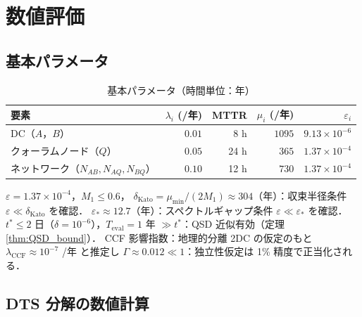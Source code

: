 \documentclass[12pt,a4paper]{article}
\theoremstyle{plain}
\theoremstyle{definition}
\theoremstyle{remark}
\newcommand{\eps}{\varepsilon}
\newcommand{\Teval}{T_{\mathrm{eval}}}
\begin{document}
\section{数値評価}\label{sec:numerical}

\subsection{基本パラメータ}

\begin{table}[H]
  \centering
  \caption{基本パラメータ（時間単位：年）}
  \label{tab:params}
  \begin{tabular}{lrrrr}
    \toprule
    要素 & $\lambda_i$ (/年) & MTTR & $\mu_i$ (/年) & $\eps_i$ \\
    \midrule
    DC（$A$，$B$）                              & $0.01$  & 8 h  & $1095$ & $9.13\times10^{-6}$ \\
    クォーラムノード（$Q$）                      & $0.05$  & 24 h & $365$  & $1.37\times10^{-4}$ \\
    ネットワーク（$N_{AB},N_{AQ},N_{BQ}$） & $0.10$  & 12 h & $730$  & $1.37\times10^{-4}$ \\
    \bottomrule
  \end{tabular}
\end{table}

$\eps=1.37\times10^{-4}$，$M_1\le0.6$，
$\delta_{\mathrm{Kato}}=\mu_{\min}/(2M_1)\approx304$（年）：収束半径条件 $\eps\ll\delta_{\mathrm{Kato}}$ を確認．
$\eps_*\approx12.7$（年）：スペクトルギャップ条件 $\eps\ll\eps_*$ を確認．
$t^*\le2$ 日（$\delta=10^{-6}$），$\Teval=1$ 年 $\gg t^*$：QSD 近似有効（定理 \ref{thm:QSD_bound}）．
CCF 影響指数：地理的分離 2DC の仮定のもと $\lambda_{\mathrm{CCF}}\approx10^{-7}$ /年 と推定し
$\Gamma\approx0.012\ll1$：独立性仮定は 1\% 精度で正当化される．

\subsection{DTS 分解の数値計算}
\end{document}
